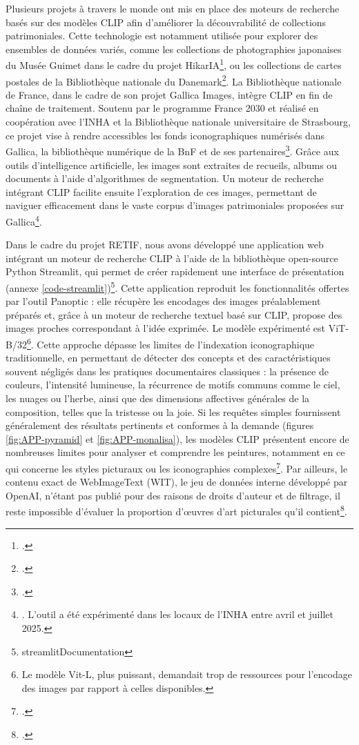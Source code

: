 Plusieurs projets à travers le monde ont mis en place des moteurs de recherche basés sur des modèles CLIP afin d’améliorer la découvrabilité de collections patrimoniales. Cette technologie est notamment utilisée pour explorer des ensembles de données variés, comme les collections de photographies japonaises du Musée Guimet dans le cadre du projet HikarIA\footcite{HikarIA}, ou les collections de cartes postales de la Bibliothèque nationale du Danemark\footcite{haffendenUnearthingForgottenImages2023}. La Bibliothèque nationale de France, dans le cadre de son projet Gallica Images, intègre CLIP en fin de chaîne de traitement. Soutenu par le programme France 2030 et réalisé en coopération avec l’INHA et la Bibliothèque nationale universitaire de Strasbourg, ce projet vise à rendre accessibles les fonds iconographiques numérisés dans Gallica, la bibliothèque numérique de la BnF et de ses partenaires\footcite{bibliothequenationaledefranceProjetsIntelligenceArtificielle}. Grâce aux outils d’intelligence artificielle, les images sont extraites de recueils, albums ou documents à l’aide d’algorithmes de segmentation. Un moteur de recherche intégrant CLIP facilite ensuite l’exploration de ces images, permettant de naviguer efficacement dans le vaste corpus d’images patrimoniales proposées sur Gallica\footnote{\cite{adamovaProjetGallicaImages2024}. L’outil a été expérimenté dans les locaux de l’INHA entre avril et juillet 2025.}.

Dans le cadre du projet RETIF, nous avons développé une application web intégrant un moteur de recherche CLIP à l’aide de la bibliothèque open-source Python Streamlit, qui permet de créer rapidement une interface de présentation (annexe \ref{code-streamlit})\footnote{streamlitDocumentation}. Cette application reproduit les fonctionnalités offertes par l’outil Panoptic : elle récupère les encodages des images préalablement préparés et, grâce à un moteur de recherche textuel basé sur CLIP, propose des images proches correspondant à l’idée exprimée. Le modèle expérimenté est ViT-B/32\footnote{Le modèle Vit-L, plus puissant, demandait trop de ressources pour l’encodage des images par rapport à celles disponibles.}. Cette approche dépasse les limites de l’indexation iconographique traditionnelle, en permettant de détecter des concepts et des caractéristiques souvent négligés dans les pratiques documentaires classiques : la présence de couleurs, l’intensité lumineuse, la récurrence de motifs communs comme le ciel, les nuages ou l’herbe, ainsi que des dimensions affectives générales de la composition, telles que la tristesse ou la joie. Si les requêtes simples fournissent généralement des résultats pertinents et conformes à la demande (figures \ref{fig:APP-pyramid} et \ref{fig:APP-monalisa}), les modèles CLIP présentent encore de nombreuses limites pour analyser et comprendre les peintures, notamment en ce qui concerne les styles picturaux ou les iconographies complexes\footcite{aspertiDoesCLIPPerceive2025}. Par ailleurs, le contenu exact de WebImageText (WIT), le jeu de données interne développé par OpenAI, n’étant pas publié pour des raisons de droits d’auteur et de filtrage, il reste impossible d’évaluer la proportion d’œuvres d’art picturales qu’il contient\footcite[p. 4-5]{radfordLearningTransferableVisual2021}.

